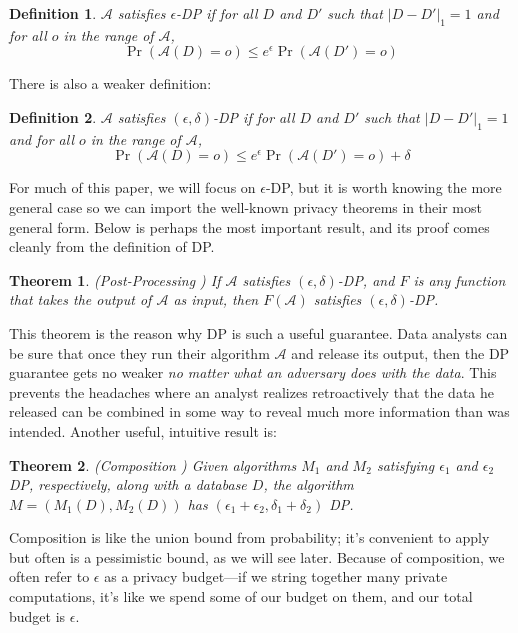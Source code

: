 \documentclass[11pt]{article}
\newtheorem{theorem}{Theorem}
\newtheorem{defn}{Definition}
\begin{document}
\begin{defn}
$\mathcal{A}$ satisfies $\epsilon$-DP if for all $D$ and $D'$ such that $|D-D'|_1=1$ and for all $o$ in the range of $\mathcal{A}$, 
\[\Pr\left(\mathcal{A}(D) = o \right) \leq e^{\epsilon} \Pr\left(\mathcal{A}(D')=o\right)\]
\end{defn}

There is also a weaker definition: 

\begin{defn}
$\mathcal{A}$ satisfies $(\epsilon, \delta)$-DP if for all $D$ and $D'$ such that $|D-D'|_1=1$ and for all $o$ in the range of $\mathcal{A}$, 
\[\Pr\left(\mathcal{A}(D) = o \right) \leq e^{\epsilon} \Pr\left(\mathcal{A}(D')=o \right) + \delta\]
\end{defn}

For much of this paper, we will focus on $\epsilon$-DP, but it is worth knowing the more general case so we can import the well-known privacy theorems in their most general form. Below is perhaps the most important result, and its proof comes cleanly from the definition of DP.

\begin{theorem}
(Post-Processing \cite{Dwork:2006}) If $\mathcal{A}$ satisfies $(\epsilon, \delta)$-DP, and $F$ is any function that takes the output of $\mathcal{A}$ as input, then $F(\mathcal{A})$ satisfies $(\epsilon, \delta)$-DP.
\end{theorem}
This theorem is the reason why DP is such a useful guarantee. Data analysts can be sure that once they run their algorithm $\mathcal{A}$ and release its output, then the DP guarantee gets no weaker \emph{no matter what an adversary does with the data}. This prevents the headaches where an analyst realizes retroactively that the data he released can be combined in some way to reveal much more information than was intended. Another useful, intuitive result is:

\begin{theorem} \label{thm:comp}
(Composition \cite{Dwork:2006}) Given algorithms $M_1$ and $M_2$ satisfying $\epsilon_1$ and $\epsilon_2$ DP, respectively, along with a database $D$, the algorithm $M = (M_1(D), M_2(D))$ has $(\epsilon_1+\epsilon_2, \delta_1+\delta_2)$ DP.
\end{theorem}
Composition is like the union bound from probability; it's convenient to apply but often is a pessimistic bound, as we will see later. Because of composition, we often refer to $\epsilon$ as a privacy budget---if we string together many private computations, it's like we spend some of our budget on them, and our total budget is $\epsilon$.
\end{document}
